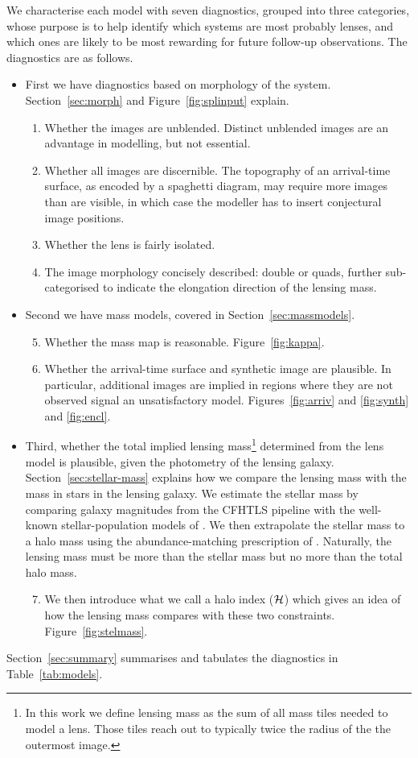 We characterise each model with seven diagnostics, grouped into three 
categories, whose purpose is to help identify which systems are most probably 
lenses, and which ones are likely to be most rewarding for future follow-up 
observations. The diagnostics are as follows.

\begin{itemize}
\item First we have diagnostics based on morphology of the
  system.
  Section~\ref{sec:morph} and Figure~\ref{fig:splinput} explain.
\begin{enumerate}
\item Whether the images are unblended.  Distinct unblended images are
  an advantage in modelling, but not essential.
\item Whether all images are discernible.  The topography of an
  arrival-time surface, as encoded by a spaghetti diagram, may require
  more images than are visible, in which case the modeller has to
  insert conjectural image positions.
\item Whether the lens is fairly isolated.
\item The image morphology concisely described: double or quads,
  further sub-categorised to indicate the elongation direction of the
  lensing mass.
\end{enumerate}
\item Second we have mass models, covered in Section~\ref{sec:massmodels}.
\begin{enumerate}
\setcounter{enumi}{4}
\item Whether the mass map is reasonable. Figure~\ref{fig:kappa}.
\item Whether the arrival-time surface and synthetic image are
  plausible.  In particular, additional images are implied in regions
  where they are not observed signal an unsatisfactory model.
  Figures~\ref{fig:arriv} and \ref{fig:synth} and \ref{fig:encl}.
\end{enumerate}
\item Third, whether the total implied lensing mass\footnote{
    In this work we define lensing mass as the sum of all mass tiles
    needed to model a lens. Those tiles reach out to typically twice
    the radius of the the outermost image. }
  determined from the lens model is plausible, given the
  photometry of the lensing galaxy.  Section~\ref{sec:stellar-mass}
  explains how we compare the lensing mass with the mass in stars in
  the lensing galaxy.  We estimate the stellar mass by comparing
  galaxy magnitudes from the CFHTLS pipeline with the well-known
  stellar-population models of \cite{2003MNRAS.344.1000B}.  We then
  extrapolate the stellar mass to a halo mass using the
  abundance-matching prescription of \cite{2010ApJ...710..903M}.
  Naturally, the lensing mass must be more than the stellar mass but
  no more than the total halo mass.
\begin{enumerate}
\setcounter{enumi}{6}
\item We then introduce what we call a halo index ($\mathcal{H}$) which
  gives an idea of how the lensing mass compares with these two
  constraints.  Figure~\ref{fig:stelmass}.
\end{enumerate}
\end{itemize}

Section~\ref{sec:summary} summarises and tabulates the diagnostics in
Table~\ref{tab:models}.




